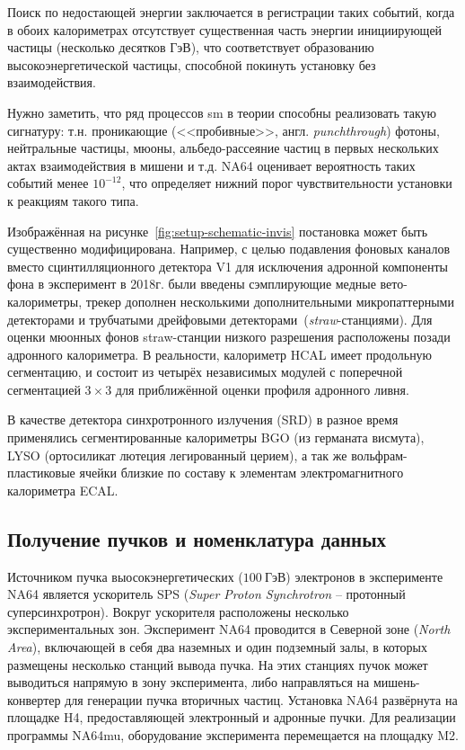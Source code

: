 Поиск по недостающей энергии заключается в регистрации таких событий,
когда в обоих калориметрах отсутствует существенная часть энергии
инициирующей частицы (несколько десятков ГэВ), что соответствует
образованию высокоэнергетической частицы, способной покинуть
установку без взаимодействия.

Нужно заметить, что ряд процессов \acrshort{sm} в теории способны
реализовать такую сигнатуру: т.н. проникающие (<<пробивные>>,
англ. \emph{punchthrough}) фотоны, нейтральные частицы, мюоны,
альбедо-рассеяние частиц в первых нескольких актах взаимодействия в
мишени и т.д. NA64 оценивает вероятность таких событий менее $10^{-12}$,
что определяет нижний порог чувствительности установки к реакциям такого
типа.

Изображённая на рисунке~\ref{fig:setup-schematic-invis} постановка
может быть существенно модифицирована. Например, с целью подавления фоновых
каналов вместо сцинтилляционного детектора V1 для исключения
адронной компоненты фона в эксперимент в 2018г. были введены сэмплирующие
медные вето-калориметры, трекер дополнен несколькими дополнительными
микропаттерными детекторами и трубчатыми дрейфовыми
детекторами~(\emph{straw}-станциями). Для оценки мюонных фонов
straw-станции низкого разрешения расположены позади адронного калориметра.
В реальности, калориметр HCAL имеет продольную сегментацию, и состоит из
четырёх независимых модулей с поперечной сегментацией $3\times 3$ для
приближённой оценки профиля адронного ливня.

В качестве детектора синхротронного излучения (SRD) в разное время применялись
сегментированные калориметры BGO (из германата висмута), LYSO (ортосиликат
лютеция легированный церием), а так же вольфрам-пластиковые ячейки близкие
по составу к элементам электромагнитного калориметра ECAL.


\subsection{Получение пучков и номенклатура данных}

Источником пучка выосокэнергетических ($100~\text{ГэВ}$) электронов в
эксперименте NA64 является ускоритель SPS (\emph{Super Proton
Synchrotron} – протонный суперсинхротрон). Вокруг ускорителя расположены
несколько экспериментальных зон. Эксперимент NA64 проводится в
Северной зоне (\emph{North Area}), включающей в себя два наземных
и один подземный залы, в которых размещены несколько станций вывода
пучка. На этих станциях пучок может выводиться напрямую в зону
эксперимента, либо направляться на мишень-конвертер для генерации пучка
вторичных частиц. Установка NA64 развёрнута на площадке H4,
предоставляющей электронный и адронные пучки. Для
реализации программы NA64mu, оборудование эксперимента перемещается на
площадку M2.

